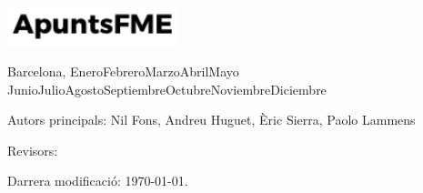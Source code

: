 \begin{titlepage}
	
	\vspace{2\baselineskip} %
	
	
	\vfill %
	
	
	\includegraphics[width=5cm]{../logo.pdf}
	
	\vspace{0.3\baselineskip} %
	
	Barcelona, %
	{\ifcase \month \or Enero\or Febrero\or Marzo\or Abril\or Mayo \or Junio\or Julio\or Agosto\or Septiembre\or Octubre\or Noviembre\or Diciembre\fi \:  \number \year}
	
	
	
\end{titlepage}

\vspace*{\fill}

\thispagestyle{empty}

\noindent Autors principals: Nil Fons, Andreu Huguet, Èric Sierra, Paolo Lammens

\quad

\noindent Revisors: %

\quad

\noindent %

\quad

\noindent Darrera modificació: \today.

\doclicenseThis
